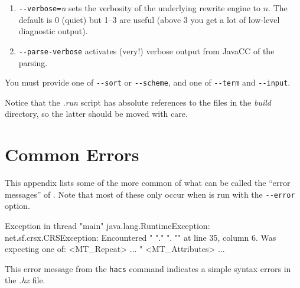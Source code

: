 \documentclass[11pt]{article} %
\begin{document}
\begin{manual}
\begin{enumerate}
  \item \verb"--verbose="\emph{n} sets the verbosity of the underlying \CRSX rewrite engine to $n$. The
    default is 0 (quiet) but 1--3 are useful (above 3 you get a lot of low-level diagnostic output).

  \item \verb"--parse-verbose" activates (very!) verbose output from JavaCC of the parsing.

  \end{enumerate}
  You must provide one of \verb"--sort" or \verb"--scheme", and one of \verb"--term" and \verb"--input".

  Notice that the \emph{.run} script has absolute references to the files in the \emph{build}
  directory, so the latter should be moved with care.
\end{manual}




\section{Common Errors}\label{app:errors}

This appendix lists some of the more common of what can be called the ``error messages'' of
\HAX. Note that most of these only occur when \HAX is run with the \verb'--error' option.

\begin{error}\leavevmode
  \begin{code}
Exception in thread "main" java.lang.RuntimeException: net.sf.crsx.CRSException:
 Encountered " "." ". "" at line 35, column 6.
Was expecting one of:
    <MT_Repeat> ...
    "%
    <MT_Attributes> ...
  \end{code}
  This error message from the \verb'hacs' command indicates a simple syntax errors in the \emph{.hx}
  file.
\end{error}
\end{document}
